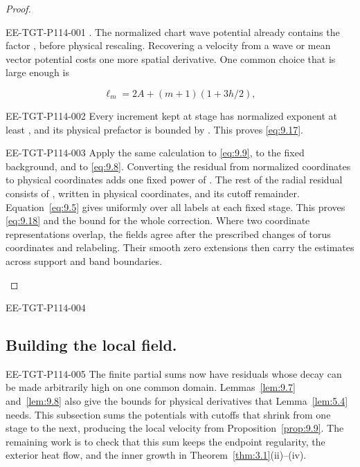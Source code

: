 \begin{proof}
\begin{EESegment}{EE-TGT-P114-001}
. The normalized chart wave potential already contains the factor
, before physical rescaling. Recovering a velocity from a wave or
mean vector potential costs one more spatial derivative. One common choice that is large enough is
\end{EESegment}
\[
\ell_m=2A+(m+1)(1+3h/2),
\]
\begin{EESegment}{EE-TGT-P114-002}
Every increment kept at stage  has normalized exponent at least
, and its physical prefactor is bounded by
. This proves \eqref{eq:9.17}.
\end{EESegment}

\begin{EESegment}{EE-TGT-P114-003}
Apply the same calculation to \eqref{eq:9.9}, to the fixed background, and to \eqref{eq:9.8}.
Converting the residual from normalized coordinates to physical coordinates adds one fixed power of
. The rest of the radial residual consists of
, written in physical coordinates, and its cutoff remainder.
Equation~\eqref{eq:9.5} gives  uniformly over all labels at each
fixed stage. This proves \eqref{eq:9.18} and the bound for the whole correction. Where two
coordinate representations overlap, the fields agree after the prescribed changes of torus
coordinates and relabeling. Their smooth zero extensions then carry the estimates across support
and band boundaries.
\end{EESegment}
\end{proof}

\begin{EESegment}{EE-TGT-P114-004}
\subsection{Building the local field.}\label{sec:9.5}
\end{EESegment}
\begin{EESegment}{EE-TGT-P114-005}
The finite partial sums  now have residuals whose decay can
be made arbitrarily high on one common domain. Lemmas~\ref{lem:9.7} and~\ref{lem:9.8} also give
the bounds for physical derivatives that Lemma~\ref{lem:5.4} needs. This subsection sums the
potentials with cutoffs that shrink from one stage to the next, producing the local velocity
 from Proposition~\ref{prop:9.9}. The remaining work is to
check that this sum keeps the endpoint regularity, the exterior heat flow, and the inner growth in
Theorem~\ref{thm:3.1}(ii)--(iv).
\end{EESegment}

